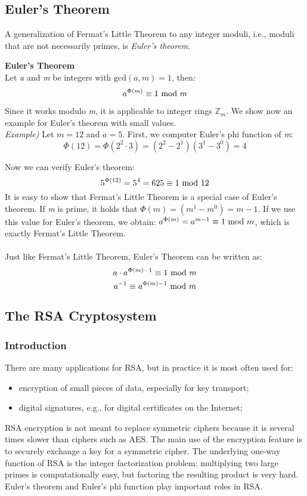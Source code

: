 \subsection{Euler's Theorem}
A generalization of Fermat's Little Theorem to any integer moduli, i.e., moduli that are not necessarily primes, is \textit{Euler's theorem}.
\begin{center}\begin{framed}
    \hfill\break\textbf{Euler's Theorem}\\
    Let \textit{a} and \textit{m} be integers with $\text{gcd}(\textit{a},\textit{m})=1$, then:
    $$a^{\Phi(m)}\equiv1\text{ mod } m$$
\end{framed}\end{center}
Since it works modulo \textit{m}, it is applicable to integer rings $\mathbb{Z}_m$. We show now an example for Euler's theorem with small values.\\

\textit{Example)} Let $m=12$ and $a=5$. First, we computer Euler's phi function of \textit{m}:
$$\Phi(12)=\Phi(2^2\cdot3)=(2^2-2^1)(3^1-3^0)=4$$

Now we can verify Euler's theorem:
$$5^{\Phi(12)}=5^4=625\equiv1\text{ mod }12$$
It is easy to show that Fermat's Little Theorem is a special case of Euler's theorem. If \textit{m} is prime, it holds that $\Phi(m)=(m^1-m^0)=m-1$. If we use this value for Euler's theorem, we obtain: $a^{\Phi(m)}=a^{m-1}\equiv1\text{ mod } m$, which is exactly Fermat's Little Theorem.\\\\
Just like Fermat's Little Theorem, Euler's Theorem can be written as:
$$a\cdot a^{\Phi(m)-1}\equiv1\text{ mod } m$$
$$a^{-1}\equiv a^{\Phi(m)-1}\text{ mod } m$$

\newpage
\subsection{The RSA Cryptosystem}
\subsubsection{Introduction}
There are many applications for RSA, but in practice it is most often used for:
\begin{itemize}
    \item encryption of small pieces of data, especially for key transport;
    \item digital signatures, e.g., for digital certificates on the Internet;
\end{itemize}
RSA encryption is not meant to replace symmetric ciphers because it is several times slower than ciphers such as AES. The main use of the encryption feature is to securely exchange a key for a symmetric cipher. The underlying one-way function of RSA is the integer factorization problem: multiplying two large primes is computationally easy, but factoring the resulting product is very hard. Euler's theorem and Euler's phi function play important roles in RSA.

